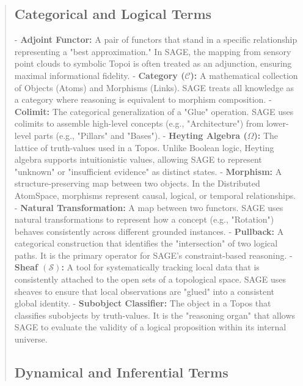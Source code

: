 \documentclass[10pt,twocolumn,letterpaper]{article}
\begin{document}
\begin{abstract}
\subsection{Categorical and Logical Terms}

- \textbf{Adjoint Functor:} A pair of functors that stand in a specific relationship representing a "best approximation." In SAGE, the mapping from sensory point clouds to symbolic Topoi is often treated as an adjunction, ensuring maximal informational fidelity.
- \textbf{Category ($\mathcal{C}$):} A mathematical collection of Objects (Atoms) and Morphisms (Links). SAGE treats all knowledge as a category where reasoning is equivalent to morphism composition.
- \textbf{Colimit:} The categorical generalization of a "Glue" operation. SAGE uses colimits to assemble high-level concepts (e.g., "Architecture") from lower-level parts (e.g., "Pillars" and "Bases").
- \textbf{Heyting Algebra ($\Omega$):} The lattice of truth-values used in a Topos. Unlike Boolean logic, Heyting algebra supports intuitionistic values, allowing SAGE to represent "unknown" or "insufficient evidence" as distinct states.
- \textbf{Morphism:} A structure-preserving map between two objects. In the Distributed AtomSpace, morphisms represent causal, logical, or temporal relationships.
- \textbf{Natural Transformation:} A map between two functors. SAGE uses natural transformations to represent how a concept (e.g., "Rotation") behaves consistently across different grounded instances.
- \textbf{Pullback:} A categorical construction that identifies the "intersection" of two logical paths. It is the primary operator for SAGE's constraint-based reasoning.
- \textbf{Sheaf $(\mathcal{S})$:} A tool for systematically tracking local data that is consistently attached to the open sets of a topological space. SAGE uses sheaves to ensure that local observations are "glued" into a consistent global identity.
- \textbf{Subobject Classifier:} The object in a Topos that classifies subobjects by truth-values. It is the "reasoning organ" that allows SAGE to evaluate the validity of a logical proposition within its internal universe.

\subsection{Dynamical and Inferential Terms}


\end{abstract}
\end{document}
